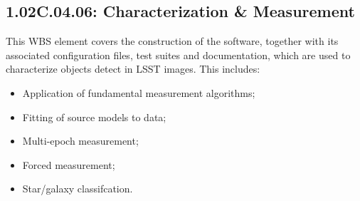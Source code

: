 \subsection{1.02C.04.06: Characterization \& Measurement}

This WBS element covers the construction of the software, together with
its associated configuration files, test suites and documentation, which
are used to characterize objects detect in LSST images. This includes:

\begin{itemize}
\item{Application of fundamental measurement algorithms;}
\item{Fitting of source models to data;}
\item{Multi-epoch measurement;}
\item{Forced measurement;}
\item{Star/galaxy classifcation.}
\end{itemize}
